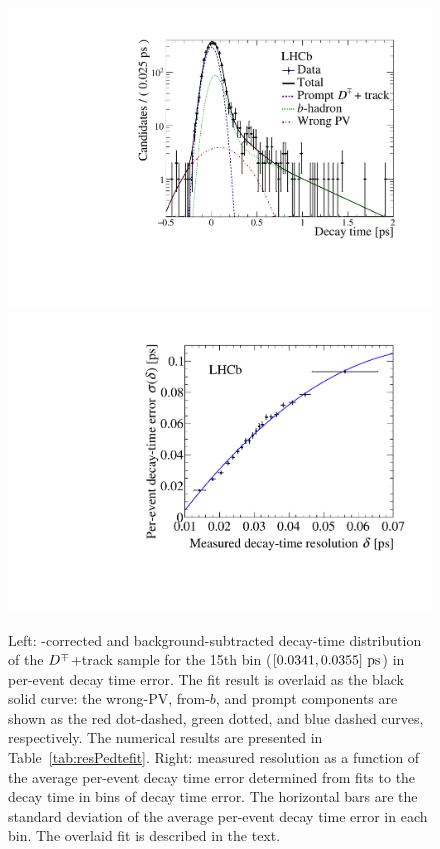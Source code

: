 \begin{figure}[tbp]
	\begin{center}
			 \includegraphics[width=0.49\linewidth]{05DecaytimeFit/figs/resolution/resolution_promptDtimefit_15bin_log_plot.pdf}
			 \includegraphics[width=0.49\linewidth]{05DecaytimeFit/figs/resolution/resolution_pedtecalibpdf_pedtecalib_lin_plot.pdf}	
	\end{center}
        \vspace{-2mm}
			      \caption{Left: \pt-corrected and background-subtracted decay-time distribution of the $D^\mp$+track sample for the 15th bin ($[0.0341,0.0355]~\rm ps$) in per-event decay time error. The fit result is overlaid as the black solid curve: the wrong-PV, from-$b$, and prompt components are shown as the red dot-dashed, green dotted, and blue dashed curves, respectively. The numerical results are presented in Table~\ref{tab:resPedtefit}. Right: measured resolution as a function of the average per-event decay time error determined from fits to the decay time in bins of decay time error. The horizontal bars are the standard deviation of the average per-event decay time error in each bin. The overlaid fit is described in the text.
				  \label{fig:resPedte}}
\end{figure}
